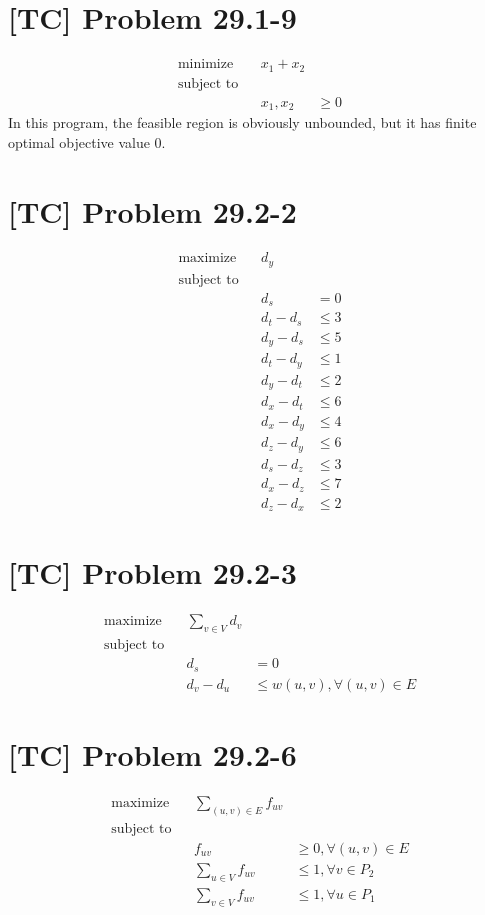\documentclass[a4paper,11pt,twocolumn]{article}
\begin{document}
  \section{[TC] Problem 29.1-9}
  \begin{align*}
    \text{minimize} && x_1 + x_2 \\
    \text{subject to} \\
    && x_1, x_2 & \geq 0
  \end{align*}
  In this program, the feasible region is obviously unbounded, but it has finite optimal objective value $0$.

  \section{[TC] Problem 29.2-2}
  \begin{align*}
    \text{maximize} && d_y \\
    \text{subject to} \\
    && d_s & = 0 \\
    && d_t - d_s & \leq 3 \\
    && d_y - d_s & \leq 5 \\
    && d_t - d_y & \leq 1 \\
    && d_y - d_t & \leq 2 \\
    && d_x - d_t & \leq 6 \\
    && d_x - d_y & \leq 4 \\
    && d_z - d_y & \leq 6 \\
    && d_s - d_z & \leq 3 \\
    && d_x - d_z & \leq 7 \\
    && d_z - d_x & \leq 2
  \end{align*}

  \section{[TC] Problem 29.2-3}
  \begin{align*}
    \text{maximize} && \sum_{v \in V} d_v \\
    \text{subject to} \\
    && d_s & = 0 \\
    && d_v - d_u & \leq w(u, v), \forall (u, v) \in E
  \end{align*}

  \section{[TC] Problem 29.2-6}
  \begin{align*}
    \text{maximize} && \sum_{(u, v) \in E} f_{uv} \\
    \text{subject to} \\
    && f_{uv} & \geq 0, \forall (u, v) \in E \\
    && \sum_{u \in V} f_{uv} & \leq 1, \forall v \in P_2 \\
    && \sum_{v \in V} f_{uv} & \leq 1, \forall u \in P_1
  \end{align*}
\end{document}
